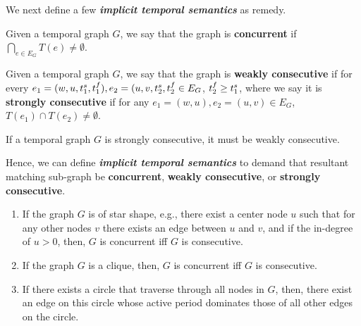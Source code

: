 We next define a few {\bf {\em implicit temporal semantics}} as remedy. 

\begin{defn}
  \label{def:concur}
  Given a temporal graph $G$, we say that the graph is {\bf concurrent} if
  $\displaystyle\bigcap_{e \in E_G}T(e) \neq \emptyset$.
\end{defn}

\begin{defn}
  \label{def:consec}  
  Given a temporal graph $G$, we say that the graph is \textbf{weakly
    consecutive} if for every $e_1 = (w,u, t^s_1 , t^f_1), e_2 = (u,v, t^s_2, t^f_2 \in
  E_G$, $t^f_2 \geq t^s_1$, where we say it is {\bf strongly consecutive} if for
  any $e_1 = (w,u), e_2=(u,v) \in E_G$, $T(e_1) \cap T(e_2) \neq \emptyset$.
\end{defn}

\begin{lemma}
If a temporal graph $G$ is strongly consecutive, it must be weakly consecutive.
\end{lemma}

Hence, we can define {\bf {\em implicit temporal semantics}} to demand that
resultant matching sub-graph be \textbf{concurrent}, \textbf{weakly
  consecutive}, or \textbf{strongly consecutive}.

\SmallSpace
{}
 \begin{enumerate}
	\item If the graph $G$ is of star shape, e.g., there exist a center node
          $u$ such that for any other nodes $v$ there exists an edge between $u$
          and $v$, and if the in-degree of $u>0$, then, $G$ is concurrent iff $G$ is consecutive.
	\item If the graph $G$ is a clique, then, $G$ is concurrent iff $G$ is
          consecutive.
	\item If there exists a circle that traverse through all nodes in $G$,
          then, there exist an edge on this circle whose active period dominates
          those of all other edges on the circle.
	
\end{enumerate}

